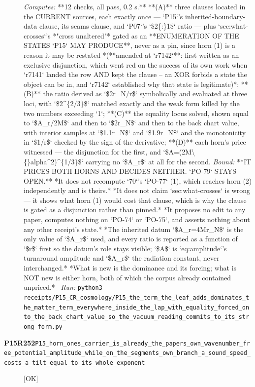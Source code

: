 \begin{description}
\emph{Computes:} **12 checks, all pass, 0.2 s.** **(A)** three clauses located in the CURRENT sources, each exactly once --- `P15`'s inherited-boundary-data clause, its seams clause, and `P07`'s `\$2\{:\}1\$` ratio --- plus `sec:what-crosses`'s *"cross unaltered"* gated as an **ENUMERATION OF THE STATES `P15` MAY PRODUCE**, never as a pin, since horn (1) is a reason it may be restated *(**amended at `r7142`**: first written as an exclusive disjunction, which went red on the success of its own work when `r7141` landed the row AND kept the clause -- an XOR forbids a state the object can be in, and `r7142` established why that state is legitimate)*; **(B)** the ratio derived as `\$2r\_N/r\$` symbolically and evaluated at three loci, with `\$2\textasciicircum{}\{2/3\}\$` matched exactly and the weak form killed by the two numbers exceeding `1`; **(C)** the equality locus solved, shown equal to `\$A\_r/2M\$` and then to `\$2r\_N\$` and then to the back chart value, with interior samples at `\$1.1r\_N\$` and `\$1.9r\_N\$` and the monotonicity in `\$1/r\$` checked by the sign of the derivative; **(D)** each horn's price witnessed --- the disjunction for the first, and `\$A=(2M\textbackslash\{\}alpha\textasciicircum{}2)\textasciicircum{}\{1/3\}\$` carrying no `\$A\_r\$` at all for the second.
 \emph{Bound:}  **IT PRICES BOTH HORNS AND DECIDES NEITHER. `PO-79` STAYS OPEN.**  *It does not recompute `70`'s `PO-77` (1), which reaches horn (2) independently and is theirs.*  *It does not claim `sec:what-crosses` is wrong --- it shows what horn (1) would cost that clause, which is why the clause is gated as a disjunction rather than pinned.*  *It proposes no edit to any paper, computes nothing on `PO-74` or `PO-75`, and asserts nothing about any other receipt's state.*  *The inherited datum `\$A\_r=4Mr\_N\$` is the only value of `\$A\_r\$` used, and every ratio is reported as a function of `\$r\$` first so the datum's role stays visible; `\$A\$` is `eq:amplitude`'s turnaround amplitude and `\$A\_r\$` the radiation constant, never interchanged.*  *What is new is the dominance and its forcing; what is NOT new is either horn, both of which the corpus already contained unpriced.*
\ \emph{Run:} \texttt{python3 receipts/P15\_CR\_cosmology/P15\_the\_term\_the\_leaf\_adds\_dominates\_the\_matter\_term\_everywhere\_inside\_the\_lap\_with\_equality\_forced\_onto\_the\_back\_chart\_value\_so\_the\_vacuum\_reading\_commits\_to\_its\_strong\_form.py}
\item[\rcptlabel{P15_horn_ones_carrier_is_already_the_papers_own_wavenumber_free_potential_amplitude_while_on_the_segments_own_branch_a_sound_speed_costs_a_tilt_equal_to_its_whole_exponent}{P15R252}\textbf{P15R252}\quad\texttt{P15\_horn\_ones\_carrier\_is\_already\_the\_papers\_own\_wavenumber\_free\_potential\_amplitude\_while\_on\_the\_segments\_own\_branch\_a\_sound\_speed\_costs\_a\_tilt\_equal\_to\_its\_whole\_exponent}]\hfill\textsf{[OK]}\\

\end{description}
